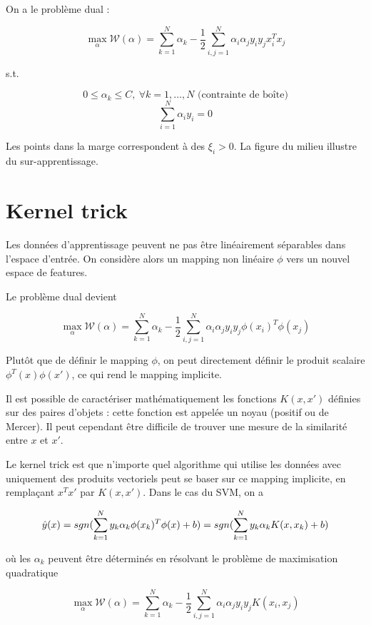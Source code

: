 	
	On a le problème dual :
	
	$$\max_\alpha \mathcal{W}(\alpha) = \sum_{k = 1}^N \alpha_k - \frac{1}{2} \sum_{i, j = 1}^N \alpha_i \alpha_j y_i y_j x_i^T x_j$$
	
	s.t.
	
	$$0 \leq \alpha_k \leq C, \: \forall k = 1, \dots , N \text{ (contrainte de boîte)}$$
	$$\sum_{i = 1}^N \alpha_i y_i = 0$$
	
	
	Les points dans la marge correspondent à des $\xi_i > 0$. La figure du milieu illustre du sur-apprentissage.
	
\section{Kernel trick}


Les données d'apprentissage peuvent ne pas être linéairement séparables dans l'espace d'entrée. On considère alors un mapping non linéaire $\phi$ vers un nouvel espace de features.


Le problème dual devient

$$\max_\alpha \mathcal{W}(\alpha) = \sum_{k = 1}^N \alpha_k - \frac{1}{2} \sum_{i, j = 1}^N \alpha_i \alpha_j y_i y_j \phi(x_i)^T \phi(x_j)$$

Plutôt que de définir le mapping $\phi$, on peut directement définir le produit scalaire $\phi^T(x) \phi(x')$, ce qui rend le mapping implicite.

Il est possible de caractériser mathématiquement les fonctions $K(x, x')$ définies sur des paires d'objets : cette fonction est appelée un noyau (positif ou de Mercer). Il peut cependant être difficile de trouver une mesure de la similarité entre $x$ et $x'$.

Le kernel trick est que n'importe quel algorithme qui utilise les données avec uniquement des produits vectoriels peut se baser sur ce mapping implicite, en remplaçant $x^Tx'$ par $K(x, x')$. Dans le cas du SVM, on a

$$\hat{y}(x) = sgn(\sum_{k = 1}^N y_k \alpha_k \phi(x_k)^T\phi(x) + b) = sgn(\sum_{k = 1}^N y_k \alpha_k K(x, x_k) + b)$$

où les $\alpha_k$ peuvent être déterminés en résolvant le problème de maximisation quadratique 

$$\max_\alpha \mathcal{W}(\alpha) = \sum_{k = 1}^N \alpha_k - \frac{1}{2} \sum_{i, j = 1}^N \alpha_i \alpha_j y_i y_j K(x_i, x_j)$$


